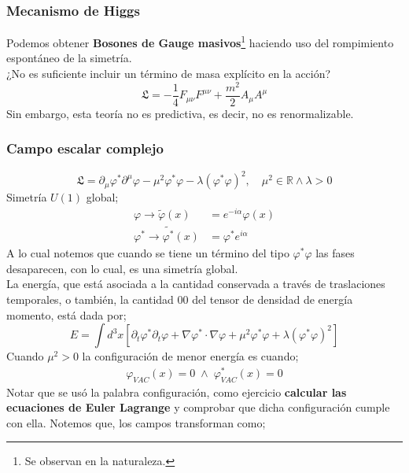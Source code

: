 \documentclass[../main.tex]{subfiles}
\begin{document}
\subsubsection{Mecanismo de Higgs}
Podemos obtener \textbf{Bosones de Gauge masivos}\footnote{Se observan en la naturaleza.} haciendo uso del rompimiento espontáneo de la simetría. \\
¿No es suficiente incluir un término de masa explícito en la acción? 
\begin{equation}
  \mathfrak{L} = -\frac{1}{4} F_{\mu\nu} F^{\mu\nu} + \frac{m^2}{2}A_{\mu} A^{\mu}
 \end{equation}
 Sin embargo, esta teoría no es predictiva, es decir, no es renormalizable. \\
 \subsubsection{Campo escalar complejo}
 \begin{equation}
   \mathfrak{L} = \partial_\mu \varphi^* \partial^\mu \varphi -\mu^2 \varphi^*\varphi - \lambda \left( \varphi^* \varphi \right)^2,\quad \mu^2 \in \mathbb{R} \wedge \lambda >0
  \end{equation}
  Simetría $U(1)$ global;
\begin{align*}
  \varphi \rightarrow \tilde{\varphi}(x) & = e^{-i\alpha}\varphi(x) \\
  \varphi^* \rightarrow \tilde{\varphi^*}(x) & = \varphi^* e^{i\alpha}
\end{align*} 
A lo cual notemos que cuando se tiene un término del tipo $\varphi^*\varphi$ las fases desaparecen, con lo cual, es una simetría global. \\
La energía, que está asociada a la cantidad conservada a través de traslaciones temporales, o también, la cantidad $00$ del tensor de densidad de energía momento, está dada por;
\begin{equation}
  E=\int d^3x \left[ \partial_t\varphi^* \partial_t \varphi + \nabla\varphi^* \cdot \nabla \varphi + \mu^2 \varphi^* \varphi + \lambda \left( \varphi^*\varphi \right)^2 \right]
 \end{equation}
 Cuando $\mu^2>0$ la configuración de menor energía es cuando;
 \begin{align*}
   \varphi_{VAC}(x) = 0 \; \wedge \; \varphi_{VAC}^*(x) = 0
 \end{align*}
Notar que se usó la palabra configuración, como ejercicio \textbf{calcular las ecuaciones de Euler Lagrange} y comprobar que dicha configuración cumple con ella. Notemos que, los campos transforman como;
\end{document}
